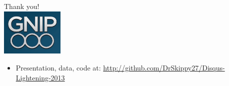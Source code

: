 \documentclass{beamer}
\begin{document}

\begin{frame}
  \begin{center}
    {\Large Thank you!}  \\ [20pt]
    \includegraphics[width=3cm]{./imgs/logo.png} \\ [15pt]
    \begin{itemize}
    \item Presentation, data, code at: \url{http://github.com/DrSkippy27/Disqus-Lightening-2013}
    \end{itemize}
  \end{center}
\end{frame}
\end{document}
